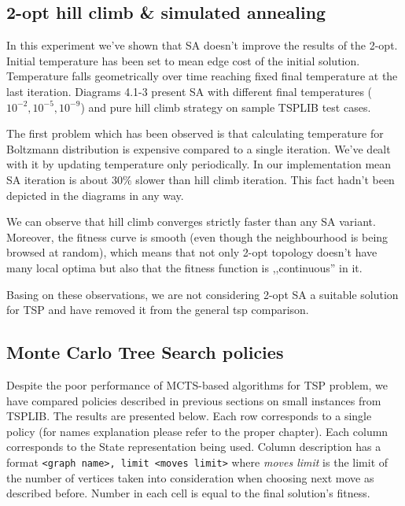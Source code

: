 \subsection { 2-opt hill climb \& simulated annealing }
In this experiment we've shown that SA doesn't improve the results of the 2-opt.
Initial temperature has been set to mean edge cost of the initial solution.
Temperature falls geometrically over time reaching fixed final temperature at the last iteration.
Diagrams 4.1-3 present SA with different final temperatures ($10^{-2}, 10^{-5}, 10^{-9}$) and
pure hill climb strategy on sample TSPLIB test cases.

\FloatBarrier
\begin{figure}[h]

\end{figure}
\begin{figure}[h]

\end{figure}
\begin{figure}[h]

\end{figure}
\FloatBarrier

The first problem which has been observed is that calculating temperature for Boltzmann distribution is
expensive compared to a single iteration. We've dealt with it by updating temperature
only periodically. In our implementation mean SA iteration is about $30\%$ slower than
hill climb iteration. This fact hadn't been depicted in the diagrams in any way.

We can observe that hill climb converges strictly faster than any SA variant.
Moreover, the fitness curve is smooth (even though the neighbourhood is being browsed at random),
which means that not only 2-opt topology doesn't have many local optima but also that the
fitness function is ,,continuous'' in it.

Basing on these observations, we are not considering 2-opt SA a
suitable solution for TSP and have removed it from the general tsp comparison.

\subsection{Monte Carlo Tree Search policies}

Despite the poor performance of MCTS-based algorithms for TSP problem, we have
compared policies described in previous sections on small instances from
TSPLIB. The results are presented below. Each row corresponds to a single
policy (for names explanation please refer to the proper chapter). Each column
corresponds to the State representation being used. Column description has a
format \verb+<graph name>, limit <moves limit>+ where \emph{moves limit} is
the limit of the number of vertices taken into consideration when choosing next
move as described before. Number in each cell is equal to the final solution's
fitness.

